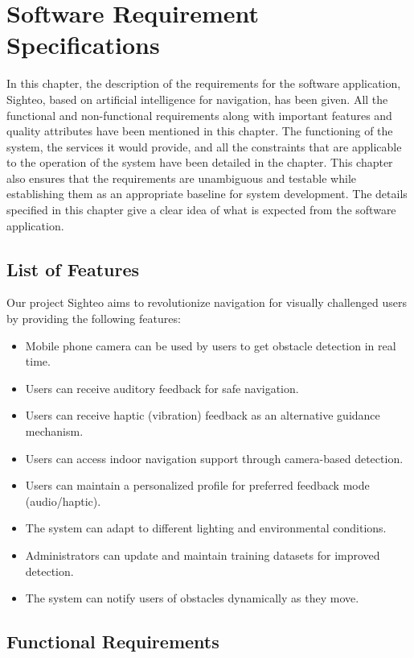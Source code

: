 \documentclass{FastFyp}
\begin{document}
\chapter{Software Requirement Specifications}
In this chapter, the description of the requirements for the software application, Sighteo, based on artificial intelligence for navigation, has been given. All the functional and non-functional requirements along with important features and quality attributes have been mentioned in this chapter. The functioning of the system, the services it would provide, and all the constraints that are applicable to the operation of the system have been detailed in the chapter. This chapter also ensures that the requirements are unambiguous and testable while establishing them as an appropriate baseline for system development. The details specified in this chapter give a clear idea of what is expected from the software application.

\section{List of Features}
Our project Sighteo aims to revolutionize navigation for visually challenged users by providing the following features:

\begin{itemize}
    \item Mobile phone camera can be used by users to get obstacle detection in real time.
    \item Users can receive auditory feedback for safe navigation.
    \item Users can receive haptic (vibration) feedback as an alternative guidance mechanism.
    \item Users can access indoor navigation support through camera-based detection.
    \item Users can maintain a personalized profile for preferred feedback mode (audio/haptic).
    \item The system can adapt to different lighting and environmental conditions.
    \item Administrators can update and maintain training datasets for improved detection.
    \item The system can notify users of obstacles dynamically as they move.
\end{itemize}

\section{Functional Requirements}
\end{document}
